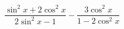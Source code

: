 \begin{ex}[type=expression]
	\begin{condition}
		\( \dfrac{\sin^2x+2\cos^2x}{2\sin^2x-1}-\dfrac{3\cos^2x}{1-2\cos^2x} \)
	\end{condition}
\end{ex}